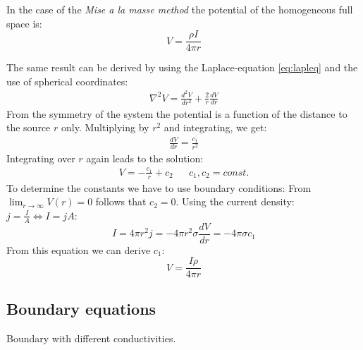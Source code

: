 In the case of the \textit{Mise a la masse method} the potential of the homogeneous full space is:
\begin{equation}
V=\frac{\rho I}{4\pi r}
\end{equation}

The same result can be derived by using the Laplace-equation \eqref{eq:lapleq} and the use of spherical coordinates:
\begin{align*}
\nabla^2 V=\frac{d^2V}{dr^2}+\frac{2}{r}\frac{dV}{dr}
\end{align*}
From the symmetry of the system the potential is a function of the distance to the source $r$ only. Multiplying by $r^2$ and integrating, we get:
\begin{align*}
\frac{dV}{dr}=\frac{c_1}{r^2}
\end{align*}
Integrating over $r$ again leads to the solution:
\begin{align*}
V=-\frac{c_1}{r}+c_2 && c_1,c_2 = const.
\end{align*}
To determine the constants we have to use boundary conditions: From $\lim_{r \to \infty} V(r) = 0$ follows that $c_2=0$. Using the current density: $j=\frac{I}{A}\Leftrightarrow I=jA$:
\begin{equation*}
I=4\pi r^2j=-4\pi r^2\sigma\frac{dV}{dr}=-4\pi\sigma c_1
\end{equation*}
From this equation we can derive $c_1$:
\begin{equation}
V=\frac{I\rho}{4\pi r}
\end{equation}

\subsection*{Boundary equations}
Boundary with different conductivities.

